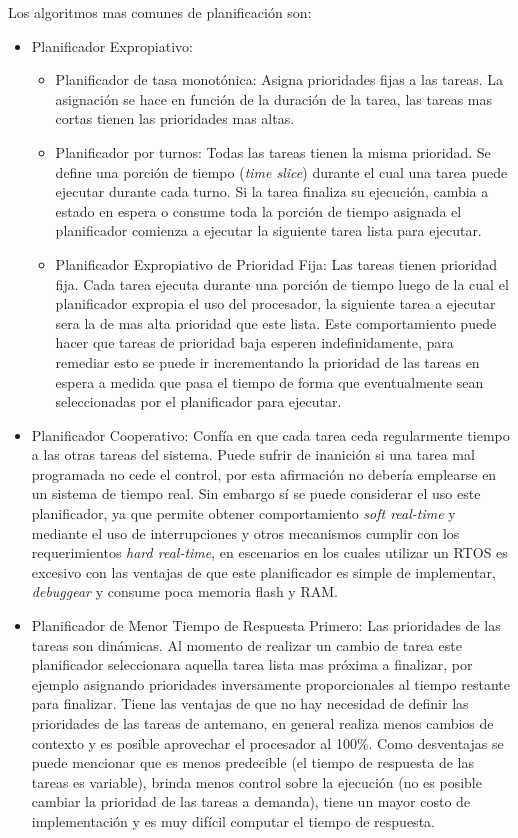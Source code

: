 \documentclass[withindex,glossary]{cam-thesis}
\begin{document}
Los algoritmos mas comunes de planificación son:
\begin{itemize}[topsep=-11pt, noitemsep]
  \item Planificador Expropiativo:
  	\begin{itemize}[topsep=-11pt, noitemsep]
  	  \item Planificador de tasa monotónica: Asigna prioridades fijas a las tareas. La asignación se hace en función de la duración de la tarea, las tareas mas cortas tienen las prioridades mas altas. 
      \item Planificador por turnos: Todas las tareas tienen la misma prioridad. Se define una porción de tiempo (\textit{time slice}) durante el cual una tarea puede ejecutar durante cada turno. Si la tarea finaliza su ejecución, cambia a estado en espera o consume toda la porción de tiempo asignada el planificador comienza a ejecutar la siguiente tarea lista para ejecutar.
      \item Planificador Expropiativo de Prioridad Fija: Las tareas tienen prioridad fija. Cada tarea ejecuta durante una porción de tiempo luego de la cual el planificador expropia el uso del procesador, la siguiente tarea a ejecutar sera la de mas alta prioridad que este lista. Este comportamiento puede hacer que tareas de prioridad baja esperen indefinidamente, para remediar esto se puede ir incrementando la prioridad de las tareas en espera a medida que pasa el tiempo de forma que eventualmente sean seleccionadas por el planificador para ejecutar.
  	\end{itemize}
  \item Planificador Cooperativo: Confía en que cada tarea ceda regularmente tiempo a las otras tareas del sistema. Puede sufrir de inanición si una tarea mal programada no cede el control, por esta afirmación no debería emplearse en un sistema de tiempo real. Sin embargo sí se puede considerar el uso este planificador, ya que permite obtener comportamiento \textit{soft real-time} y mediante el uso de interrupciones y otros mecanismos cumplir con los requerimientos \textit{hard real-time}, en escenarios en los cuales utilizar un RTOS es excesivo con las ventajas de que este planificador es simple de implementar, \textit{debuggear} y consume poca memoria flash y RAM.
  \item Planificador de Menor Tiempo de Respuesta Primero: Las prioridades de las tareas son dinámicas. Al momento de realizar un cambio de tarea este planificador seleccionara aquella tarea lista mas próxima a finalizar, por ejemplo asignando prioridades inversamente proporcionales al tiempo restante para finalizar. Tiene las ventajas de que no hay necesidad de definir las prioridades de las tareas de antemano, en general realiza menos cambios de contexto y es posible aprovechar el procesador al 100\%. Como desventajas se puede mencionar que es menos predecible (el tiempo de respuesta de las tareas es variable), brinda menos control sobre la ejecución (no es posible cambiar la prioridad de las tareas a demanda), tiene un mayor costo de implementación y es muy difícil computar el tiempo de respuesta. \\[-7pt]
\end{itemize}
\end{document}
